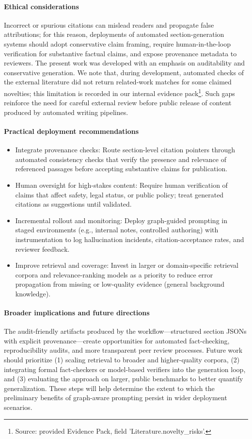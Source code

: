 \documentclass{article}%
\begin{document}
\paragraph{Ethical considerations}
Incorrect or spurious citations can mislead readers and propagate false attributions; for this reason, deployments of automated section-generation systems should adopt conservative claim framing, require human-in-the-loop verification for substantive factual claims, and expose provenance metadata to reviewers. The present work was developed with an emphasis on auditability and conservative generation. We note that, during development, automated checks of the external literature did not return related-work matches for some claimed novelties; this limitation is recorded in our internal evidence pack\footnote{Source: provided Evidence Pack, field 'Literature.novelty_risks'.}. Such gaps reinforce the need for careful external review before public release of content produced by automated writing pipelines.

\paragraph{Practical deployment recommendations}
\begin{itemize}
  \item Integrate provenance checks: Route section-level citation pointers through automated consistency checks that verify the presence and relevance of referenced passages before accepting substantive claims for publication.
  \item Human oversight for high-stakes content: Require human verification of claims that affect safety, legal status, or public policy; treat generated citations as suggestions until validated.
  \item Incremental rollout and monitoring: Deploy graph-guided prompting in staged environments (e.g., internal notes, controlled authoring) with instrumentation to log hallucination incidents, citation-acceptance rates, and reviewer feedback.
  \item Improve retrieval and coverage: Invest in larger or domain-specific retrieval corpora and relevance-ranking models as a priority to reduce error propagation from missing or low-quality evidence (general background knowledge).
\end{itemize}

\paragraph{Broader implications and future directions}
The audit-friendly artifacts produced by the workflow—structured section JSONs with explicit provenance—create opportunities for automated fact-checking, reproducibility audits, and more transparent peer review processes. Future work should prioritize (1) scaling retrieval to broader and higher-quality corpora, (2) integrating formal fact-checkers or model-based verifiers into the generation loop, and (3) evaluating the approach on larger, public benchmarks to better quantify generalization. These steps will help determine the extent to which the preliminary benefits of graph-aware prompting persist in wider deployment scenarios.
\end{document}
